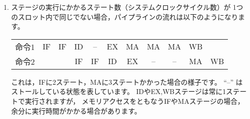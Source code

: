 \documentclass[a4j,10pt,fleqn]{jsarticle}
\begin{document}
\begin{enumerate}

\item ステージの実行にかかるステート数（システムクロックサイクル数）が
    1つのスロット内で同じでない場合，パイプラインの流れは以下のようになります。

    \begin{center}\begin{tabular}{r|cc|cc|c|ccc|c|c}
    命令1 & IF & IF & ID & -- & EX & MA & MA & MA & WB &    \\
    命令2 &    &    & IF & IF & ID & EX & -- & -- & MA & WB \\
    \end{tabular}\end{center}

    これは，IFに2ステート，MAに3ステートかかった場合の様子です。
    ``--'' はストールしている状態を表しています。
    IDやEX,WBステージは常に1ステートで実行されますが，
    メモリアクセスをともなうIFやMAステージの場合，
    余分に実行時間がかかる場合があります。


\end{enumerate}
\end{document}
